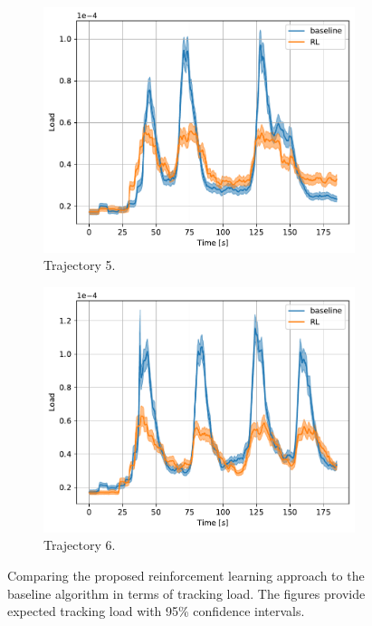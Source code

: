 \documentclass[english, 12pt, a4paper, elec, utf8, a-1b, online]{aaltothesis}
\begin{document}
\begin{figure}[htb]
    \hfill
    \begin{subfigure}[b]{0.45\textwidth}
        \centering
        \includegraphics[width=\linewidth]{figures/benchmark/Simulations/tracking_load_4.pdf}
        \caption{Trajectory 5.}
        \label{fig:TL_T5}
    \end{subfigure}
    \hfill
    \begin{subfigure}[b]{0.45\textwidth}
        \centering
        \includegraphics[width=\linewidth]{figures/benchmark/Simulations/tracking_load_5.pdf}
        \caption{Trajectory 6.}
        \label{fig:TL_T6}
    \end{subfigure}
    \caption{Comparing the proposed reinforcement learning approach to the baseline algorithm in terms of tracking load.
    The figures provide expected tracking load with 95\% confidence intervals.}
    \label{fig:tracking_load_comparison}
\end{figure}
\end{document}
